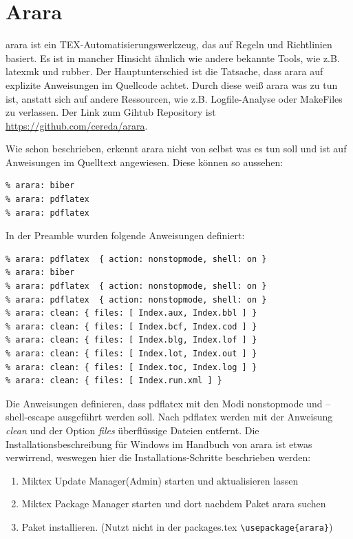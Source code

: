 \section{Arara}
arara ist ein TEX-Automatisierungswerkzeug, das auf Regeln und Richtlinien basiert. Es ist in mancher Hinsicht ähnlich wie andere bekannte Tools, wie z.B. latexmk\autocite{latexmk} und rubber\autocite{rubber}. Der Hauptunterschied ist die Tatsache, dass arara auf explizite Anweisungen im Quellcode achtet. Durch diese weiß arara was zu tun ist, anstatt sich auf andere Ressourcen, wie z.B. Logfile-Analyse oder MakeFiles zu verlassen. Der Link zum Gihtub Repository ist \url{https://github.com/cereda/arara}. 

Wie schon beschrieben, erkennt arara nicht von selbst was es tun soll und ist auf Anweisungen im Quelltext angewiesen. Diese können so aussehen:
\begin{lstlisting}[style=Latex]
% arara: pdflatex
% arara: biber
% arara: pdflatex
% arara: pdflatex
\end{lstlisting}

In der Preamble wurden folgende Anweisungen definiert:
\begin{lstlisting}[style=Latex]
% arara: pdflatex  { action: nonstopmode, shell: on }
% arara: pdflatex  { action: nonstopmode, shell: on }
% arara: biber
% arara: pdflatex  { action: nonstopmode, shell: on }
% arara: pdflatex  { action: nonstopmode, shell: on }
% arara: clean: { files: [ Index.aux, Index.bbl ] }
% arara: clean: { files: [ Index.bcf, Index.cod ] } 
% arara: clean: { files: [ Index.blg, Index.lof ] }
% arara: clean: { files: [ Index.lot, Index.out ] } 
% arara: clean: { files: [ Index.toc, Index.log ] } 
% arara: clean: { files: [ Index.run.xml ] }
\end{lstlisting}

Die Anweisungen definieren, dass pdflatex mit den Modi nonstopmode und --shell-escape ausgeführt werden soll. Nach pdflatex werden mit der Anweisung \emph{clean} und der Option \emph{files} überflüssige Dateien entfernt. 
Die Installationsbeschreibung für Windows im Handbuch von arara ist etwas verwirrend, weswegen hier die Installations-Schritte beschrieben werden:
\begin{enumerate}
\item Miktex Update Manager(Admin) starten und aktualisieren lassen
\item Miktex Package Manager starten und dort nachdem Paket arara suchen
\item Paket installieren. (Nutzt nicht in der packages.tex \verb|\usepackage{arara}|)	
\end{enumerate}

